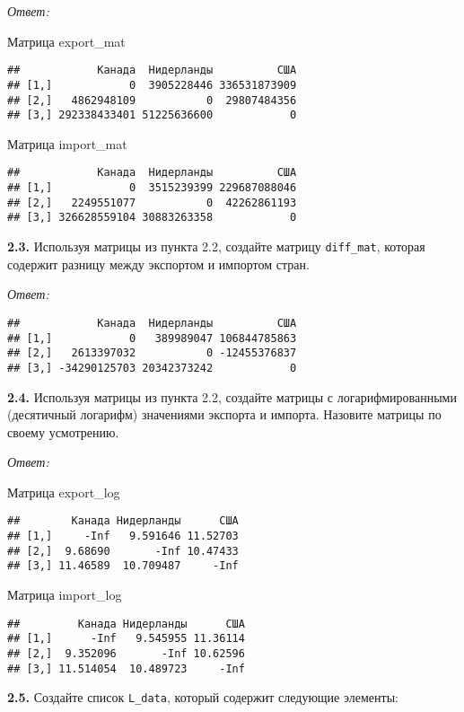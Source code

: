 \documentclass[
]{article}
\begin{document}
\emph{Ответ:}

Матрица export\_mat

\begin{verbatim}
##            Канада  Нидерланды          США
## [1,]            0  3905228446 336531873909
## [2,]   4862948109           0  29807484356
## [3,] 292338433401 51225636600            0
\end{verbatim}

Матрица import\_mat

\begin{verbatim}
##            Канада  Нидерланды          США
## [1,]            0  3515239399 229687088046
## [2,]   2249551077           0  42262861193
## [3,] 326628559104 30883263358            0
\end{verbatim}

\textbf{2.3.} Используя матрицы из пункта 2.2, создайте матрицу
\texttt{diff\_mat}, которая содержит разницу между экспортом и импортом
стран.

\emph{Ответ:}

\begin{verbatim}
##            Канада  Нидерланды          США
## [1,]            0   389989047 106844785863
## [2,]   2613397032           0 -12455376837
## [3,] -34290125703 20342373242            0
\end{verbatim}

\textbf{2.4.} Используя матрицы из пункта 2.2, создайте матрицы с
логарифмированными (десятичный логарифм) значениями экспорта и импорта.
Назовите матрицы по своему усмотрению.

\emph{Ответ:}

Матрица export\_log

\begin{verbatim}
##        Канада Нидерланды      США
## [1,]     -Inf   9.591646 11.52703
## [2,]  9.68690       -Inf 10.47433
## [3,] 11.46589  10.709487     -Inf
\end{verbatim}

Матрица import\_log

\begin{verbatim}
##         Канада Нидерланды      США
## [1,]      -Inf   9.545955 11.36114
## [2,]  9.352096       -Inf 10.62596
## [3,] 11.514054  10.489723     -Inf
\end{verbatim}

\textbf{2.5.} Создайте список \texttt{L\_data}, который содержит
следующие элементы:
\end{document}
